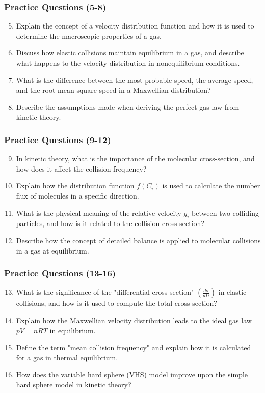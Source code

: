 \documentclass{beamer}
\begin{document}
\begin{frame}
\frametitle{Practice Questions (5-8)}
\begin{enumerate}
    \setcounter{enumi}{4}
    \item Explain the concept of a velocity distribution function and how it is used to determine the macroscopic properties of a gas.
    \item Discuss how elastic collisions maintain equilibrium in a gas, and describe what happens to the velocity distribution in nonequilibrium conditions.
    \item What is the difference between the most probable speed, the average speed, and the root-mean-square speed in a Maxwellian distribution?
    \item Describe the assumptions made when deriving the perfect gas law from kinetic theory.
\end{enumerate}
\end{frame}

\begin{frame}
\frametitle{Practice Questions (9-12)}
\begin{enumerate}
    \setcounter{enumi}{8}
    \item In kinetic theory, what is the importance of the molecular cross-section, and how does it affect the collision frequency?
    \item Explain how the distribution function \( f(C_i) \) is used to calculate the number flux of molecules in a specific direction.
    \item What is the physical meaning of the relative velocity \( g_i \) between two colliding particles, and how is it related to the collision cross-section?
    \item Describe how the concept of detailed balance is applied to molecular collisions in a gas at equilibrium.
\end{enumerate}
\end{frame}

\begin{frame}
\frametitle{Practice Questions (13-16)}
\begin{enumerate}
    \setcounter{enumi}{12}
    \item What is the significance of the "differential cross-section" \( \left( \frac{d\sigma}{d\Omega} \right) \) in elastic collisions, and how is it used to compute the total cross-section?
    \item Explain how the Maxwellian velocity distribution leads to the ideal gas law \( pV = nRT \) in equilibrium.
    \item Define the term "mean collision frequency" and explain how it is calculated for a gas in thermal equilibrium.
    \item How does the variable hard sphere (VHS) model improve upon the simple hard sphere model in kinetic theory?
\end{enumerate}
\end{frame}
\end{document}

